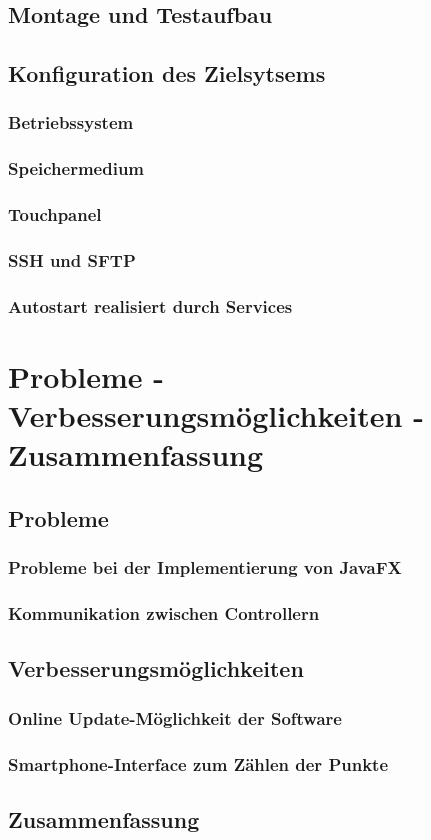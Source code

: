 \subsection{Montage und Testaufbau}
\subsection{Konfiguration des Zielsytsems}
\subsubsection{Betriebssystem}
\subsubsection{Speichermedium}
\subsubsection{Touchpanel}
\subsubsection{SSH und SFTP}
\subsubsection{Autostart realisiert durch Services}

\section{Probleme - Verbesserungsmöglichkeiten - Zusammenfassung}
\subsection{Probleme}
\subsubsection{Probleme bei der Implementierung von JavaFX}
\subsubsection{Kommunikation zwischen Controllern}
\subsection{Verbesserungsmöglichkeiten}
\subsubsection{Online Update-Möglichkeit der Software}
\subsubsection{Smartphone-Interface zum Zählen der Punkte}
\subsection{Zusammenfassung}